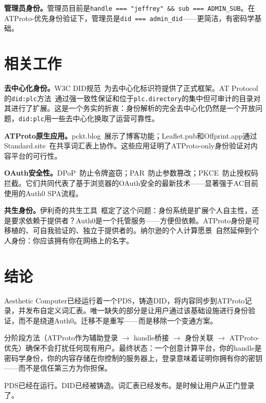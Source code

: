 \documentclass[10pt,letterpaper,twocolumn]{article}
\begin{document}
\textbf{管理员身份。}管理员目前是\texttt{handle === "jeffrey" \&\& sub === ADMIN\_SUB}。在ATProto-优先身份验证下，管理员是\texttt{did === admin\_did}——更简洁，有密码学基础。


\section{相关工作}
\label{sec:related}

\textbf{去中心化身份。}W3C DID规范~\citep{w3cdid2022}为去中心化标识符提供了正式框架。AT Protocol的\texttt{did:plc}方法~\citep{atproto2024did}通过强一致性保证和位于\texttt{plc.directory}的集中但可审计的目录对其进行了扩展。这是一个务实的折衷：身份解析的完全去中心化仍然是一个开放问题，\texttt{did:plc}用一些去中心化换取了运营可靠性。

\textbf{ATProto原生应用。}pckt.blog~\citep{pcktblog2025}展示了博客功能；Leaflet.pub和Offprint.app通过Standard.site~\citep{standardsite2025}在共享词汇表上协作。这些应用证明了ATProto-only身份验证对内容平台的可行性。

\textbf{OAuth安全性。}DPoP~\citep{rfc9449dpop}防止令牌盗窃；PAR~\citep{rfc9126par}防止参数篡改；PKCE~\citep{rfc7636pkce}防止授权码拦截。它们共同代表了基于浏览器的OAuth安全的最新技术——显著强于AC目前使用的Auth0 SPA流程。

\textbf{共生身份。}伊利奇的共生工具~\citep{illich1973tools}框定了这个问题：身份系统是扩展个人自主性，还是要求依赖于提供者？Auth0是一个托管服务——方便但依赖。ATProto身份是可移植的、可自我验证的、独立于提供者的。纳尔逊的个人计算愿景~\citep{nelson1974computerlib}自然延伸到个人身份：你应该拥有你在网络上的名字。


\section{结论}

Aesthetic Computer已经运行着一个PDS，铸造DID，将内容同步到ATProto记录，并发布自定义词汇表。唯一缺失的部分是让用户通过该基础设施进行身份验证，而不是绕道Auth0。迁移不是重写——而是移除一个变通方案。

分阶段方法（ATProto作为辅助登录 $\to$ handle桥接 $\to$ 身份关联 $\to$ ATProto-优先）确保不会打扰任何现有用户。最终状态：一个创意计算平台，你的handle是密码学身份，你的内容存储在你控制的服务器上，登录意味着证明你拥有你的密钥——而不是信任第三方为你担保。

PDS已经在运行。DID已经被铸造。词汇表已经发布。是时候让用户从正门登录了。
\end{document}
